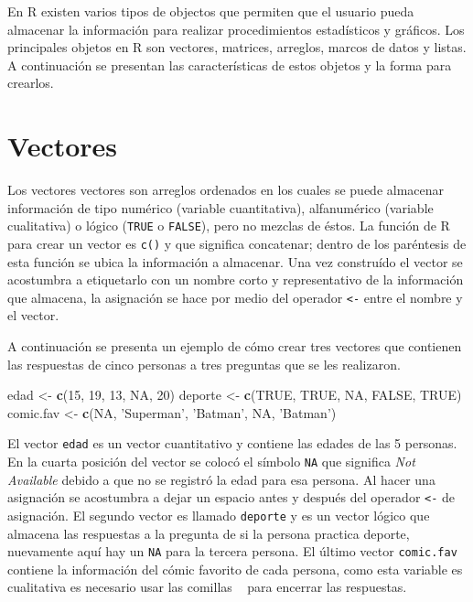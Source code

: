\documentclass[10pt,]{krantz}
\makeatletter
\newenvironment{Shaded}{\begin{snugshade}}{\end{snugshade}}
\newcommand{\KeywordTok}[1]{\textcolor[rgb]{0.13,0.29,0.53}{\textbf{#1}}}
\newcommand{\DecValTok}[1]{\textcolor[rgb]{0.00,0.00,0.81}{#1}}
\newcommand{\StringTok}[1]{\textcolor[rgb]{0.31,0.60,0.02}{#1}}
\newcommand{\OtherTok}[1]{\textcolor[rgb]{0.56,0.35,0.01}{#1}}
\newcommand{\NormalTok}[1]{#1}
\let\proglang=\textsf
\newenvironment{kframe}{%
\medskip{}
\setlength{\fboxsep}{.8em}
 \def\at@end@of@kframe{}%
 \ifinner\ifhmode%
  \def\at@end@of@kframe{\end{minipage}}%
  \begin{minipage}{\columnwidth}%
 \fi\fi%
 \def\FrameCommand##1{\hskip\@totalleftmargin \hskip-\fboxsep
 \colorbox{shadecolor}{##1}\hskip-\fboxsep
     \hskip-\linewidth \hskip-\@totalleftmargin \hskip\columnwidth}%
 \MakeFramed {\advance\hsize-\width
   \@totalleftmargin\z@ \linewidth\hsize
   \@setminipage}}%
 {\par\unskip\endMakeFramed%
 \at@end@of@kframe}
\renewenvironment{Shaded}{\begin{kframe}}{\end{kframe}}
\makeatother
\begin{document}
En \proglang{R} existen varios tipos de objectos que permiten que el
usuario pueda almacenar la información para realizar procedimientos
estadísticos y gráficos. Los principales objetos en \proglang{R} son
vectores, matrices, arreglos, marcos de datos y listas. A continuación
se presentan las características de estos objetos y la forma para
crearlos.

\section{\texorpdfstring{Vectores 
\label{vector}}{Vectores  }}\label{vectores}

Los vectores vectores son arreglos ordenados en los cuales se puede
almacenar información de tipo numérico (variable cuantitativa),
alfanumérico (variable cualitativa) o lógico (\texttt{TRUE} o
\texttt{FALSE}), pero no mezclas de éstos. La función de \proglang{R}
para crear un vector es \texttt{c()} y que significa concatenar; dentro
de los paréntesis de esta función se ubica la información a almacenar.
Una vez construído el vector se acostumbra a etiquetarlo con un nombre
corto y representativo de la información que almacena, la asignación se
hace por medio del operador \texttt{\textless{}-} entre el nombre y el
vector.

A continuación se presenta un ejemplo de cómo crear tres vectores que
contienen las respuestas de cinco personas a tres preguntas que se les
realizaron.

\begin{Shaded}
\begin{Highlighting}[]
\NormalTok{edad <-}\StringTok{ }\KeywordTok{c}\NormalTok{(}\DecValTok{15}\NormalTok{, }\DecValTok{19}\NormalTok{, }\DecValTok{13}\NormalTok{, }\OtherTok{NA}\NormalTok{, }\DecValTok{20}\NormalTok{)}
\NormalTok{deporte <-}\StringTok{ }\KeywordTok{c}\NormalTok{(}\OtherTok{TRUE}\NormalTok{, }\OtherTok{TRUE}\NormalTok{, }\OtherTok{NA}\NormalTok{, }\OtherTok{FALSE}\NormalTok{, }\OtherTok{TRUE}\NormalTok{)}
\NormalTok{comic.fav <-}\StringTok{ }\KeywordTok{c}\NormalTok{(}\OtherTok{NA}\NormalTok{, }\StringTok{'Superman'}\NormalTok{, }\StringTok{'Batman'}\NormalTok{, }\OtherTok{NA}\NormalTok{, }\StringTok{'Batman'}\NormalTok{)}
\end{Highlighting}
\end{Shaded}

El vector \texttt{edad} es un vector cuantitativo y contiene las edades
de las 5 personas. En la cuarta posición del vector se colocó el símbolo
\texttt{NA} que significa \textit{Not Available} debido a que no se
registró la edad para esa persona. Al hacer una asignación se acostumbra
a dejar un espacio antes y después del operador \texttt{\textless{}-} de
asignación. El segundo vector es llamado \texttt{deporte} y es un vector
lógico que almacena las respuestas a la pregunta de si la persona
practica deporte, nuevamente aquí hay un \texttt{NA} para la tercera
persona. El último vector \texttt{comic.fav} contiene la información del
cómic favorito de cada persona, como esta variable es cualitativa es
necesario usar las comillas
\texttt{\textquotesingle{}\ \textquotesingle{}} para encerrar las
respuestas.
\end{document}
